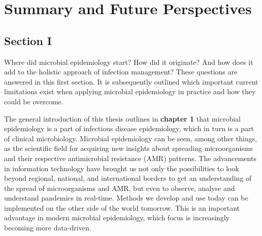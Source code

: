 \documentclass[
]{book}
\begin{document}
\hypertarget{ch11-summary}{%
\chapter{Summary and Future Perspectives}\label{ch11-summary}}

\hypertarget{section-i}{%
\section*{Section I}\label{section-i}}

Where did microbial epidemiology start? How did it originate? And how does it add to the holistic approach of infection management? These questions are answered in this first section. It is subsequently outlined which important current limitations exist when applying microbial epidemiology in practice and how they could be overcome.

The general introduction of this thesis outlines in \textbf{chapter 1} that microbial epidemiology is a part of infectious disease epidemiology, which in turn is a part of clinical microbiology. Microbial epidemiology can be seen, among other things, as the scientific field for acquiring new insights about spreading microorganisms and their respective antimicrobial resistance (AMR) patterns. The advancements in information technology have brought us not only the possibilities to look beyond regional, national, and international borders to get an understanding of the spread of microorganisms and AMR, but even to observe, analyse and understand pandemics in real-time. Methods we develop and use today can be implemented on the other side of the world tomorrow. This is an important advantage in modern microbial epidemiology, which focus is increasingly becoming more data-driven.
\end{document}
